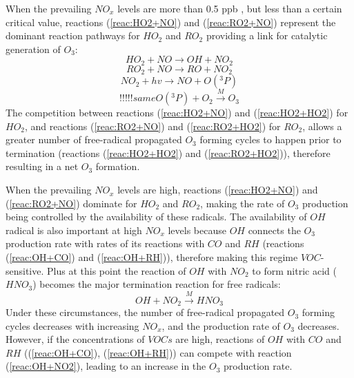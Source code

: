 \documentclass[11pt,a4paper]{article}
\begin{document}


When the prevailing $NO_x$ levels are more than 0.5 ppb \citep{Sillman1999}, but less than a certain critical value, reactions (\ref{reac:HO2+NO}) and (\ref{reac:RO2+NO}) represent the dominant reaction pathways for $HO_2$ and $RO_2$ providing a link for catalytic generation of $O_3$:
\begin{equation}\label{reac:HO2+NO}
HO_2 + NO \rightarrow OH + NO_2
\end{equation}
\begin{equation}\label{reac:RO2+NO}
RO_2 + NO \rightarrow RO + NO_2
\end{equation}
\begin{equation}\label{eq:NO2+hv}
NO_2 + hv \rightarrow NO + O(^3P)
\end{equation}
\begin{equation} %
!!!!! same O(^3P) + O_2 \xrightarrow{M} O_3
\end{equation}
The competition between reactions (\ref{reac:HO2+NO}) and (\ref{reac:HO2+HO2}) for $HO_2$, and reactions (\ref{reac:RO2+NO}) and (\ref{reac:RO2+HO2}) for $RO_2$, allows a greater number of free-radical propagated $O_3$ forming cycles to happen prior to termination (reactions (\ref{reac:HO2+HO2}) and (\ref{reac:RO2+HO2})), therefore resulting in a net $O_3$ formation. 

When the prevailing $NO_x$ levels are high, reactions (\ref{reac:HO2+NO}) and (\ref{reac:RO2+NO}) dominate for $HO_2$ and $RO_2$, making the rate of $O_3$ production being controlled by the availability of these radicals. The availability of $OH$ radical is also important at high $NO_x$ levels because $OH$ connects the $O_3$ production rate with rates of its reactions with $CO$ and $RH$ (reactions (\ref{reac:OH+CO}) and (\ref{reac:OH+RH})), therefore making this regime $VOC$-sensitive. Plus at this point the reaction of $OH$ with $NO_2$ to form nitric acid ($HNO_3$) becomes the major termination reaction for free radicals:
\begin{equation}\label{reac:OH+NO2}
OH + NO_2 \xrightarrow{M} HNO_3
\end{equation}
Under these circumstances, the number of free-radical propagated $O_3$ forming cycles decreases with increasing $NO_x$, and the production rate of $O_3$ decreases. However, if the concentrations of $VOCs$ are high, reactions of $OH$ with $CO$ and $RH$ ((\ref{reac:OH+CO}), (\ref{reac:OH+RH})) can compete with reaction (\ref{reac:OH+NO2}), leading to an increase in the $O_3$ production rate.
\end{document}
